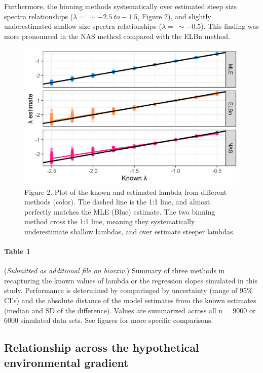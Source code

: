 \documentclass[
]{article}
\begin{document}
Furthermore, the binning methods systematically over estimated steep
size spectra relationships (\(\lambda = ~\sim-2.5~to-1.5\), Figure 2),
and slightly underestimated shallow size spectra relationships
(\(\lambda = ~\sim-0.5\)). This finding was more pronounced in the NAS
method compared with the ELBn method.

\begin{figure}
\centering
\includegraphics{figures/known_est_b_line.png}
\caption{Figure 2. Plot of the known and estimated lambda from different
methods (color). The dashed line is the 1:1 line, and almost perfectly
matches the MLE (Blue) estimate. The two binning method cross the 1:1
line, meaning they systematically underestimate shallow lambdas, and
over estimate steeper lambdas.}
\end{figure}

\hypertarget{table-1}{%
\paragraph{\texorpdfstring{\textbf{Table 1}}{Table 1}}\label{table-1}}

(\emph{Submitted as additional file on biorxiv.}) Summary of three
methods in recapturing the known values of lambda or the regression
slopes simulated in this study. Performance is determined by comparinged
by uncertainty (range of 95\% CI's) and the absolute distance of the
model estimates from the known estimates (median and SD of the
difference). Values are summarized across all n = 9000 or 6000 simulated
data sets. See figures for more specific comparisons.

\hypertarget{relationship-across-the-hypothetical-environmental-gradient}{%
\subsection{Relationship across the hypothetical environmental
gradient}\label{relationship-across-the-hypothetical-environmental-gradient}}
\end{document}
